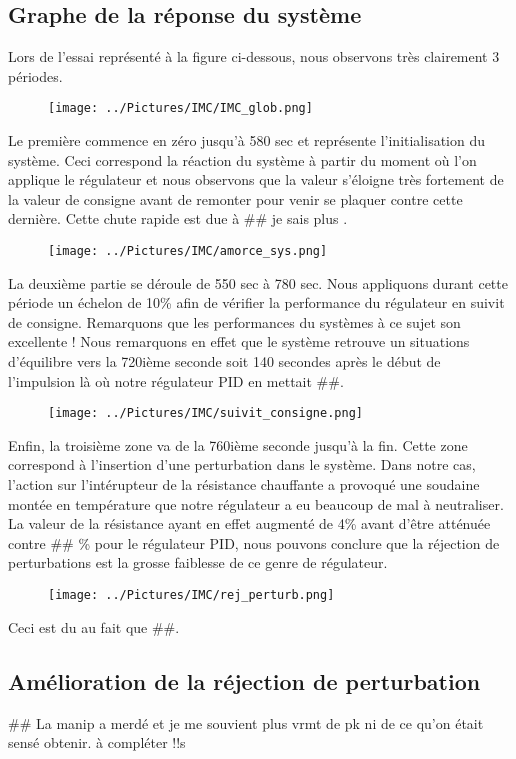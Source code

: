 \subsection{Graphe de la réponse du système}
Lors de l'essai représenté à la figure ci-dessous, nous observons très clairement 3 périodes.
\begin{figure}[H]
\texttt{[image: ../Pictures/IMC/IMC\_glob.png]}
\end{figure}
Le première commence en zéro jusqu'à 580 sec et représente l'initialisation du système. Ceci correspond la réaction du système à partir du moment où l'on applique le régulateur et nous observons que la valeur s'éloigne très fortement de la valeur de consigne avant de remonter pour venir se plaquer contre cette dernière. Cette chute rapide est due à \#\# je sais plus .
\begin{figure}[H]
\texttt{[image: ../Pictures/IMC/amorce\_sys.png]}
\end{figure}
La deuxième partie se déroule de 550 sec à 780 sec. Nous appliquons durant cette période un échelon de 10\% afin de vérifier la performance du régulateur en suivit de consigne. Remarquons que les performances du systèmes à ce sujet son excellente ! Nous remarquons en effet que le système retrouve un situations d'équilibre vers la 720ième seconde soit 140 secondes après le début de l'impulsion là où notre régulateur PID en mettait \#\#.
\begin{figure}[H]
\texttt{[image: ../Pictures/IMC/suivit\_consigne.png]}
\end{figure}
Enfin, la troisième zone va de la 760ième seconde jusqu'à la fin. Cette zone correspond à l'insertion  d'une perturbation dans le système. Dans notre cas, l'action sur l'intérupteur de la résistance chauffante a provoqué une soudaine montée en température que notre régulateur a eu beaucoup de mal à neutraliser. La valeur de la résistance ayant en effet augmenté de 4\% avant d'être atténuée contre \#\# \% pour le régulateur PID, nous pouvons conclure que la réjection de perturbations est la grosse faiblesse de ce genre de régulateur. 
\begin{figure}[H]
\texttt{[image: ../Pictures/IMC/rej\_perturb.png]}
\end{figure}
Ceci est du au fait que \#\#.
\subsection{Amélioration de la réjection de perturbation}

\#\# La manip a merdé et je me souvient plus vrmt de pk ni de ce qu'on était sensé obtenir. à compléter !!s